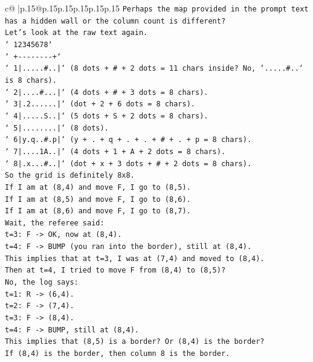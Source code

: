 \documentclass{article}
\begin{document}
{\begin{supertabular}{c@{$\;$}|p{.15\linewidth}@{}p{.15\linewidth}p{.15\linewidth}p{.15\linewidth}p{.15\linewidth}p{.15\linewidth}}
{{{\texttt{Perhaps the map provided in the prompt text has a hidden wall or the column count is different?} \\
\texttt{Let's look at the raw text again.} \\
\texttt{` 12345678`} \\
\texttt{`  +{-}{-}{-}{-}{-}{-}{-}{-}+`} \\
\texttt{` 1|.....\#..|` (8 dots + \# + 2 dots = 11 chars inside? No, `.....\#..` is 8 chars).} \\
\texttt{` 2|....\#...|` (4 dots + \# + 3 dots = 8 chars).} \\
\texttt{` 3|.2......|` (dot + 2 + 6 dots = 8 chars).} \\
\texttt{` 4|.....S..|` (5 dots + S + 2 dots = 8 chars).} \\
\texttt{` 5|........|` (8 dots).} \\
\texttt{` 6|y.q..\#.p|` (y + . + q + . + . + \# + . + p = 8 chars).} \\
\texttt{` 7|....1A..|` (4 dots + 1 + A + 2 dots = 8 chars).} \\
\texttt{` 8|.x...\#..|` (dot + x + 3 dots + \# + 2 dots = 8 chars).} \\
\texttt{So the grid is definitely 8x8.} \\
\texttt{If I am at (8,4) and move F, I go to (8,5).} \\
\texttt{If I am at (8,5) and move F, I go to (8,6).} \\
\texttt{If I am at (8,6) and move F, I go to (8,7).} \\
\texttt{Wait, the referee said:} \\
\texttt{t=3: F {-}> OK, now at (8,4).} \\
\texttt{t=4: F {-}> BUMP (you ran into the border), still at (8,4).} \\
\texttt{This implies that at t=3, I was at (7,4) and moved to (8,4).} \\
\texttt{Then at t=4, I tried to move F from (8,4) to (8,5)?} \\
\texttt{No, the log says:} \\
\texttt{t=1: R {-}> (6,4).} \\
\texttt{t=2: F {-}> (7,4).} \\
\texttt{t=3: F {-}> (8,4).} \\
\texttt{t=4: F {-}> BUMP, still at (8,4).} \\
\texttt{This implies that (8,5) is a border? Or (8,4) is the border?} \\
\texttt{If (8,4) is the border, then column 8 is the border.} \\
}}}
\end{supertabular}}
\end{document}
